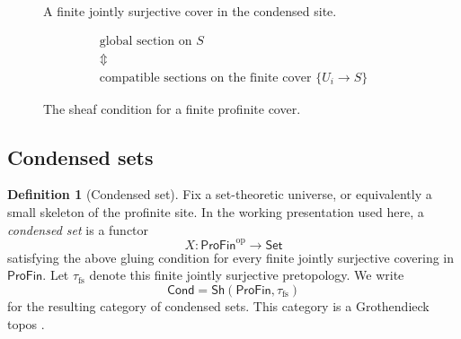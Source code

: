 \documentclass[10pt]{amsart}
\newcommand{\ProFin}{\mathsf{ProFin}}
\newcommand{\Set}{\mathsf{Set}}
\newcommand{\Cond}{\mathsf{Cond}}
\newcommand{\Sh}{\mathsf{Sh}}
\theoremstyle{plain}
\theoremstyle{definition}
\newtheorem{definition}[theorem]{Definition}
\begin{document}
\begin{figure}[htbp]
\centering
{}
\caption{A finite jointly surjective cover in the condensed site.}
\label{fig:profin-cover}
\end{figure}

\begin{figure}[htbp]
\centering
{}
\[
\begin{array}{c}
\text{global section on }S\\
\Updownarrow\\
\text{compatible sections on the finite cover }\{U_i\to S\}
\end{array}
\]
\caption{The sheaf condition for a finite profinite cover.}
\label{fig:sheaf-equalizer}
\end{figure}

\subsection{Condensed sets}

\begin{definition}[Condensed set]
Fix a set-theoretic universe, or equivalently a small skeleton of the profinite
site. In the working presentation used here, a \emph{condensed set} is a functor
\[
  X:\ProFin^{\mathrm{op}}\to\Set
\]
satisfying the above gluing condition for every finite jointly surjective
covering in $\ProFin$. Let $\tau_{\mathrm{fs}}$ denote this finite jointly
surjective pretopology. We write
\[
  \Cond=\Sh(\ProFin,\tau_{\mathrm{fs}})
\]
for the resulting category of condensed sets. This category is a Grothendieck
topos \cite{ClausenScholze,LeStumCondensed}.
\end{definition}
\end{document}
